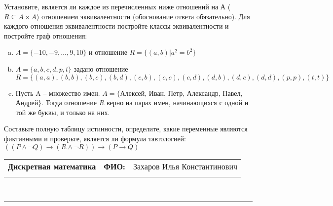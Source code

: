 \documentclass[10pt]{exam}
\newcommand{\class}{Дискретная математика}
\newcommand{\examdate}{}
\begin{document}
\begin{questions}
\question
Установите, является ли каждое из перечисленных ниже отношений на А ($R \subseteq A \times A$) отношением эквивалентности (обоснование ответа обязательно). Для каждого отношения эквивалентности постройте классы 
эквивалентности и постройте граф отношения:
\begin{enumerate} [a)]\setcounter{enumi}{0}
\item $A = \{-10, -9, … , 9, 10\}$ и отношение $R = \{(a,b)|a^{2} = b^{2}\}$
\item $A = \{a, b, c, d, p, t\}$ задано отношение $R = \{(a, a), (b, b), (b, c), (b, d), (c, b), (c, c), (c, d), (d, b), (d, c), (d, d), (p,p), (t,t)\}$
\item Пусть A – множество имен. $A = \{ $Алексей, Иван, Петр, Александр, Павел, Андрей$ \}$. Тогда отношение $R$ верно на парах имен, начинающихся с одной и той же буквы, и только на них.
\end{enumerate}\question Составьте полную таблицу истинности, определите, какие переменные являются фиктивными и проверьте, является ли формула тавтологией:
$(( P \land \neg Q) \rightarrow (R \land \neg R)) \rightarrow (P \rightarrow Q)$

\end{questions}
\newpage
\begin{flushright}
\begin{tabular}{p{2.8in} r l}
\textbf{\class} & \textbf{ФИО:} &Захаров Илья Константинович
\\

\textbf{\examdate} &&\\
\end{tabular}\\
\end{flushright}
\rule[1ex]{\textwidth}{.1pt}
\end{document}
